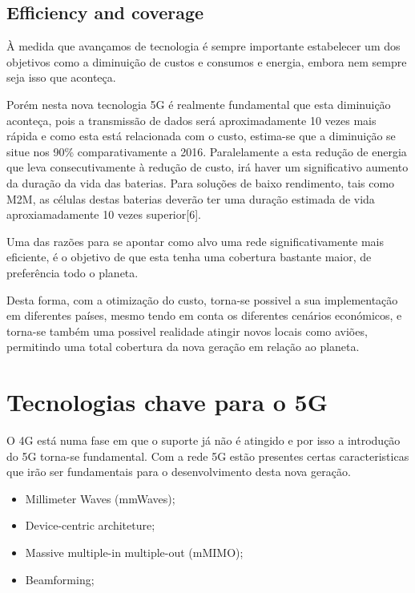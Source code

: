 \documentclass[conference]{IEEEtran}
\begin{document}
\subsection{Efficiency and coverage}
À medida que avançamos de tecnologia é sempre importante estabelecer um dos objetivos como a diminuição de custos e consumos e energia, embora nem sempre seja isso que aconteça.\par
Porém nesta nova tecnologia 5G é realmente fundamental que esta diminuição aconteça, pois a transmissão de dados será aproximadamente 10 vezes mais rápida e como esta está relacionada com o custo, estima-se que a diminuição se situe nos 90\% comparativamente a 2016. Paralelamente a esta redução de energia que leva consecutivamente à redução de custo, irá haver um significativo aumento da duração da vida das baterias.
Para soluções de baixo rendimento, tais como M2M, as células destas baterias deverão ter uma duração estimada de vida aproxiamadamente 10 vezes superior[6].\par
Uma das razões para se apontar como alvo uma rede significativamente mais eficiente, é o objetivo de que esta tenha uma cobertura bastante maior, de preferência todo o planeta.\par
Desta forma, com a otimização do custo, torna-se possivel a sua implementação em diferentes países, mesmo tendo em conta os diferentes cenários económicos, e torna-se também uma possivel realidade atingir novos locais como aviões, permitindo uma total cobertura da nova geração em relação ao planeta.







\section{Tecnologias chave para o 5G}
O 4G está numa fase em que o suporte já não é atingido e por isso a introdução do 5G torna-se fundamental. Com a rede 5G estão presentes certas caracteristicas que irão ser fundamentais para o desenvolvimento desta nova geração.
\begin{itemize}
    \item Millimeter Waves (mmWaves);
    \item Device-centric architeture;
    \item Massive multiple-in multiple-out (mMIMO);
    \item Beamforming;
\end{itemize}
\end{document}
